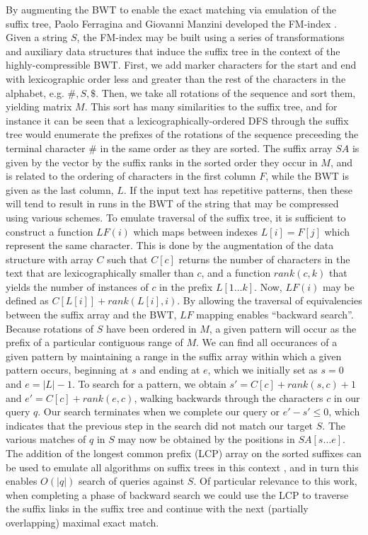 By augmenting the BWT to enable the exact matching via emulation of the suffix tree, Paolo Ferragina and Giovanni Manzini developed the FM-index \cite{ferragina2000opportunistic,ferragina2004alphabet}.
Given a string $S$, the FM-index may be built using a series of transformations and auxiliary data structures that induce the suffix tree in the context of the highly-compressible BWT.
First, we add marker characters for the start and end with lexicographic order less and greater than the rest of the characters in the alphabet, e.g. $\#,S,\$$.
Then, we take all rotations of the sequence and sort them, yielding matrix $M$.
This sort has many similarities to the suffix tree, and for instance it can be seen that a lexicographically-ordered DFS through the suffix tree would enumerate the prefixes of the rotations of the sequence preceeding the terminal character $\#$ in the same order as they are sorted.
The suffix array $SA$ is given by the vector by the suffix ranks in the sorted order they occur in $M$, and is related to the ordering of characters in the first column $F$, while the BWT is given as the last column, $L$.
If the input text has repetitive patterns, then these will tend to result in runs in the BWT of the string that may be compressed using various schemes.
To emulate traversal of the suffix tree, it is sufficient to construct a function $LF(i)$ which maps between indexes $L[i] = F[j]$ which represent the same character.
This is done by the augmentation of the data structure with array $C$ such that $C[c]$ returns the number of characters in the text that are lexicographically smaller than $c$, and a function $rank(c,k)$ that yields the number of instances of $c$ in the prefix $L[1 \ldots k]$.
Now, $LF(i)$ may be defined as $C[L[i]] + rank(L[i], i)$.
By allowing the traversal of equivalencies between the suffix array and the BWT, $LF$ mapping enables ``backward search''.
Because rotations of $S$ have been ordered in $M$, a given pattern will occur as the prefix of a particular contiguous range of $M$.
We can find all occurances of a given pattern by maintaining a range in the suffix array within which a given pattern occurs, beginning at $s$ and ending at $e$, which we initially set as $s=0$ and $e=|L|-1$.
To search for a pattern, we obtain $s' = C[c] + rank(s,c) + 1$ and $e' = C[c] + rank(e,c)$, walking backwards through the characters $c$ in our query $q$.
Our search terminates when we complete our query or $e' - s' \leq 0$, which indicates that the previous step in the search did not match our target $S$.
The various matches of $q$ in $S$ may now be obtained by the positions in $SA[s \ldots e]$.
The addition of the longest common prefix (LCP) array on the sorted suffixes can be used to emulate all algorithms on suffix trees in this context \cite{abouelhoda2004replacing}, and in turn this enables $O(|q|)$ search of queries against $S$.
Of particular relevance to this work, when completing a phase of backward search we could use the LCP to traverse the suffix links in the suffix tree and continue with the next (partially overlapping) maximal exact match.

